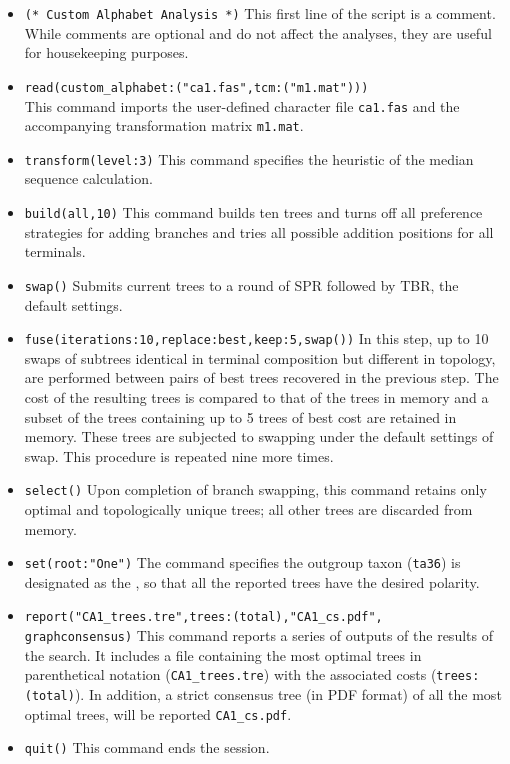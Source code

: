 \begin{itemize}
\item \texttt{(* Custom Alphabet Analysis  *)} This first line of the script is a comment. While comments 
are optional and do not affect the analyses, they are useful for housekeeping purposes.
\item \texttt{read(custom\_alphabet:("ca1.fas",tcm:("m1.mat")))} \\ This command imports the 
user-defined  character file \texttt{ca1.fas} and the accompanying 
transformation matrix \texttt{m1.mat}.
\item \texttt{transform(level:3)} This command specifies the heuristic  of the median sequence 
calculation.
\item \texttt{build(all,10)} This command builds ten trees and turns off all preference strategies for adding branches 
and tries all possible addition positions for all terminals.
\item \texttt{swap()} Submits current trees to a round of SPR followed by TBR, the default settings.
\item \texttt{fuse(iterations:10,replace:best,keep:5,swap())} In this step, up to 10 swaps of subtrees identical in terminal 
composition but different in topology, are performed between pairs of best trees recovered in the previous 
step. The cost of the resulting trees is compared to that of the trees in memory and a subset of the trees containing up to 5 
trees of best cost are retained in memory. These trees are subjected to swapping under the default settings of swap. 
This procedure is repeated nine more times.
\item \texttt{select()} Upon completion of branch swapping, this command retains only optimal and 
topologically unique trees; all other trees are discarded from memory.
\item \texttt{set(root:"One")} The  command specifies the outgroup taxon (\texttt{ta36}) 
is designated as the , so that all the reported trees have the desired polarity.
\item \texttt{report("CA1\_trees.tre",trees:(total),"CA1\_cs.pdf", \\ graphconsensus)} This command reports a series of outputs
of the results of the search.  It includes a file containing the most optimal trees in parenthetical notation (\texttt{CA1\_trees.tre}) 
with the associated costs (\texttt{trees:(total)}).  In addition, a strict consensus tree (in PDF format) of all the most 
optimal trees, will be reported \texttt{CA1\_cs.pdf}.
\item \texttt{quit()} This command ends the \poy session.
\end{itemize}

